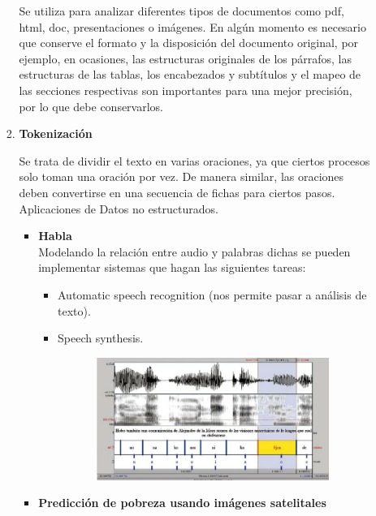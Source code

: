 \documentclass[12pt,a4paper,oneside]{book}
\begin{document}
\begin{enumerate}
\begin{enumerate}
\begin{enumerate}
							Se utiliza para analizar diferentes tipos de documentos como pdf, html, doc, presentaciones o imágenes. En algún momento es necesario que conserve el formato y la disposición del documento original, por ejemplo, en ocasiones, las estructuras originales de los párrafos, las estructuras de las tablas, los encabezados y subtítulos y el mapeo de las secciones respectivas son importantes para una mejor precisión, por lo que debe conservarlos.\\
							
							
							
						\item \textbf{ Tokenización}
						
							Se trata de dividir el texto en varias oraciones, ya que ciertos procesos solo toman una oración por vez. De manera similar, las oraciones deben convertirse en una secuencia de fichas para ciertos pasos.\\
						
						Aplicaciones de Datos no estructurados. \\
						
						\begin{itemize}
							
							\item \textbf{  Habla } \\
								
								Modelando la relación entre audio y palabras dichas se
								pueden implementar sistemas que hagan las siguientes
								tareas: \\
								 
								 \begin{itemize}
								 	
								 	\item Automatic speech recognition (nos permite pasar a análisis de texto).
								 	\item Speech synthesis. 
								 	
								 	\begin{figure}[htb]
								 		\centering \includegraphics[width=8cm, height=4cm]{img/tokenizacion.png}
								 	\end{figure}
								 \end{itemize}
				\newpage
							\item \textbf{ Predicción de pobreza usando imágenes satelitales}\\
							

\end{itemize}
\end{enumerate}
\end{enumerate}
\end{enumerate}
\end{document}
